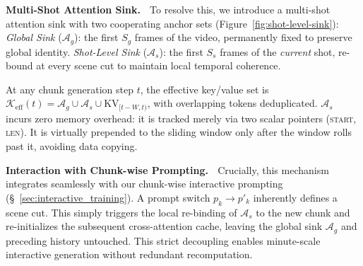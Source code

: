 \textbf{Multi-Shot Attention Sink.} $\;$
To resolve this, we introduce a multi-shot attention sink with two cooperating anchor sets (Figure~\ref{fig:shot-level-sink}): \textit{Global Sink} ($\mathcal{A}_{g}$): the first $S_g$ frames of the video, permanently fixed to preserve global identity. \textit{Shot-Level Sink} ($\mathcal{A}_{s}$): the first $S_s$ frames of the \emph{current} shot, re-bound at every scene cut to maintain local temporal coherence.


At any chunk generation step $t$, the effective key/value set is $\mathcal{K}_{\text{eff}}(t) = \mathcal{A}_{g} \cup \mathcal{A}_{s} \cup \mathrm{KV}_{[t-W, t)}$, with overlapping tokens deduplicated. $\mathcal{A}_{s}$ incurs zero memory overhead: it is tracked merely via two scalar pointers (\textsc{start}, \textsc{len}). It is virtually prepended to the sliding window only after the window rolls past it, avoiding data copying.


\textbf{Interaction with Chunk-wise Prompting.} $\;$
Crucially, this mechanism integrates seamlessly with our chunk-wise interactive prompting (\S~\ref{sec:interactive_training}). A prompt switch $p_{k}\!\to\!p'_{k}$ inherently defines a scene cut. This simply triggers the local re-binding of $\mathcal{A}_{s}$ to the new chunk and re-initializes the subsequent cross-attention cache, leaving the global sink $\mathcal{A}_{g}$ and preceding history untouched. This strict decoupling enables minute-scale interactive generation without redundant recomputation.